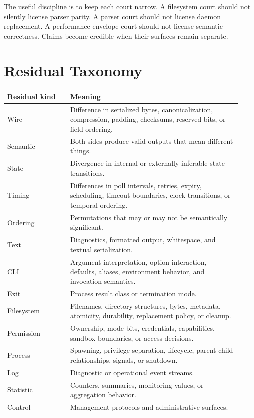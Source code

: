 \documentclass[11pt,a4paper]{article}
\begin{document}
The useful discipline is to keep each court narrow. A filesystem court should not silently license parser parity. A parser court should not license daemon replacement. A performance-envelope court should not license semantic correctness. Claims become credible when their surfaces remain separate.

\section{Residual Taxonomy}
\label{sec:taxonomy}

\begin{longtable}{p{0.25\linewidth}p{0.68\linewidth}}
\toprule
\textbf{Residual kind} & \textbf{Meaning} \\
\midrule
\endhead
Wire & Difference in serialized bytes, canonicalization, compression, padding, checksums, reserved bits, or field ordering. \\
Semantic & Both sides produce valid outputs that mean different things. \\
State & Divergence in internal or externally inferable state transitions. \\
Timing & Differences in poll intervals, retries, expiry, scheduling, timeout boundaries, clock transitions, or temporal ordering. \\
Ordering & Permutations that may or may not be semantically significant. \\
Text & Diagnostics, formatted output, whitespace, and textual serialization. \\
CLI & Argument interpretation, option interaction, defaults, aliases, environment behavior, and invocation semantics. \\
Exit & Process result class or termination mode. \\
Filesystem & Filenames, directory structures, bytes, metadata, atomicity, durability, replacement policy, or cleanup. \\
Permission & Ownership, mode bits, credentials, capabilities, sandbox boundaries, or access decisions. \\
Process & Spawning, privilege separation, lifecycle, parent-child relationships, signals, or shutdown. \\
Log & Diagnostic or operational event streams. \\
Statistic & Counters, summaries, monitoring values, or aggregation behavior. \\
Control & Management protocols and administrative surfaces. \\

\end{longtable}
\end{document}
